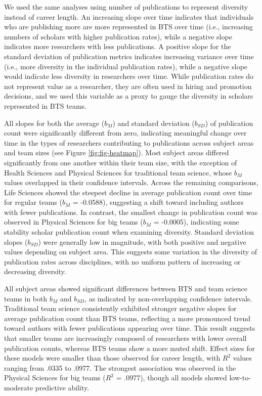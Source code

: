 \documentclass[
  man,floatsintext]{apa7}
\begin{document}
We used the same analyses using number of publications to represent
diversity instead of career length. An increasing slope over time
indicates that individuals who are publishing more are more represented
in BTS over time (i.e., increasing numbers of scholars with higher
publication rates), while a negative slope indicates more researchers
with less publications. A positive slope for the standard deviation of
publication metrics indicates increasing variance over time (i.e., more
diversity in the individual publication rates), while a negative slope
would indicate less diversity in researchers over time. While
publication rates do not represent value as a researcher, they are often
used in hiring and promotion decisions, and we used this variable as a
proxy to gauge the diversity in scholars represented in BTS teams.

All slopes for both the average (\(b_M\)) and standard deviation
(\(b_{SD}\)) of publication count were significantly different from zero,
indicating meaningful change over time in the types of researchers
contributing to publications across subject areas and team sizes (see
Figure \ref{fig:fig-heatmap}). Most subject areas differed
significantly from one another within their team size, with the
exception of Health Sciences and Physical Sciences for traditional team science, whose \(b_M\) values overlapped in their confidence intervals.
Across the remaining comparisons, Life Sciences showed the steepest
decline in average publication count over time for regular teams (\(b_M\)
= -0.0588), suggesting a shift toward including authors with fewer
publications. In contrast, the smallest change in publication count was
observed in Physical Sciences for big teams (\(b_M\) = -0.0005),
indicating some stability scholar publication count when examining
diversity. Standard deviation slopes (\(b_{SD}\)) were generally low in
magnitude, with both positive and negative values depending on subject
area. This suggests some variation in the diversity of publication rates
across disciplines, with no uniform pattern of increasing or decreasing
diversity.

All subject areas showed significant differences between BTS and team
science teams in both \(b_M\) and \(b_{SD}\), as indicated by
non-overlapping confidence intervals. Traditional team science consistently
exhibited stronger negative slopes for average publication count than
BTS teams, reflecting a more pronounced trend toward authors with fewer
publications appearing over time. This result suggests that smaller teams are
increasingly composed of researchers with lower overall publication
counts, whereas BTS teams show a more muted shift. Effect sizes for
these models were smaller than those observed for career length, with
\(R^2\) values ranging from .0335 to .0977. The strongest association was
observed in the Physical Sciences for big teams (\(R^2\) = .0977), though
all models showed low-to-moderate predictive ability.
\end{document}
